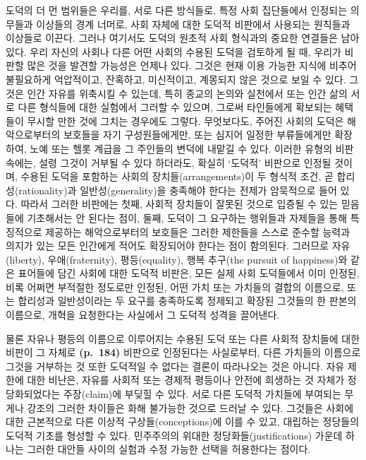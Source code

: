 도덕의 더 먼 범위들은 우리를, 서로 다른 방식들로, 특정 사회 집단들에서
인정되는 의무들과 이상들의 경계 너머로, 사회 자체에 대한 도덕적 비판에서
사용되는 원칙들과 이상들로 이끈다. 그러나 여기서도 도덕의 원초적 사회
형식과의 중요한 연결들은 남아 있다. 우리 자신의 사회나 다른 어떤 사회의
수용된 도덕을 검토하게 될 때, 우리가 비판할 많은 것을 발견할 가능성은
언제나 있다. 그것은 현재 이용 가능한 지식에 비추어 불필요하게
억압적이고, 잔혹하고, 미신적이고, 계몽되지 않은 것으로 보일 수 있다.
그것은 인간 자유를 위축시킬 수 있는데, 특히 종교의 논의와 실천에서 또는
인간 삶의 서로 다른 형식들에 대한 실험에서 그러할 수 있으며, 그로써
타인들에게 확보되는 혜택들이 무시할 만한 것에 그치는 경우에도 그렇다.
무엇보다도, 주어진 사회의 도덕은 해악으로부터의 보호들을 자기
구성원들에게만, 또는 심지어 일정한 부류들에게만 확장하여, 노예 또는 헬롯
계급을 그 주인들의 변덕에 내맡길 수 있다. 이러한 유형의 비판 속에는,
설령 그것이 거부될 수 있다 하더라도, 확실히 ‘도덕적’ 비판으로 인정될
것이며, 수용된 도덕을 포함하는 사회의 장치들(arrangements)이 두 형식적
조건, 곧 합리성(rationality)과 일반성(generality)을 충족해야 한다는
전제가 암묵적으로 들어 있다. 따라서 그러한 비판에는 첫째, 사회적
장치들이 잘못된 것으로 입증될 수 있는 믿음들에 기초해서는 안 된다는
점이, 둘째, 도덕이 그 요구하는 행위들과 자제들을 통해 특징적으로
제공하는 해악으로부터의 보호들은 그러한 제한들을 스스로 준수할 능력과
의지가 있는 모든 인간에게 적어도 확장되어야 한다는 점이 함의된다.
그러므로 자유(liberty), 우애(fraternity), 평등(equality), 행복 추구(the
pursuit of happiness)와 같은 표어들에 담긴 사회에 대한 도덕적 비판은,
모든 실제 사회 도덕들에서 이미 인정된, 비록 어쩌면 부적절한 정도로만
인정된, 어떤 가치 또는 가치들의 결합의 이름으로, 또는 합리성과
일반성이라는 두 요구를 충족하도록 정제되고 확장된 그것들의 한 판본의
이름으로, 개혁을 요청한다는 사실에서 그 도덕적 성격을 끌어낸다.

물론 자유나 평등의 이름으로 이루어지는 수용된 도덕 또는 다른 사회적
장치들에 대한 비판이 그 자체로 \textbf{(p.~184)} 
비판으로 인정된다는 사실로부터, 다른 가치들의 이름으로 그것을 거부하는
것 또한 도덕적일 수 없다는 결론이 따라나오는 것은 아니다. 자유 제한에
대한 비난은, 자유를 사회적 또는 경제적 평등이나 안전에 희생하는 것
자체가 정당화되었다는 주장(claim)에 부딪힐 수 있다. 서로 다른 도덕적
가치들에 부여되는 무게나 강조의 그러한 차이들은 화해 불가능한 것으로
드러날 수 있다. 그것들은 사회에 대한 근본적으로 다른 이상적
구상들(conceptions)에 이를 수 있고, 대립하는 정당들의 도덕적 기초를
형성할 수 있다. 민주주의의 위대한 정당화들(justifications) 가운데 하나는
그러한 대안들 사이의 실험과 수정 가능한 선택을 허용한다는 점이다.

